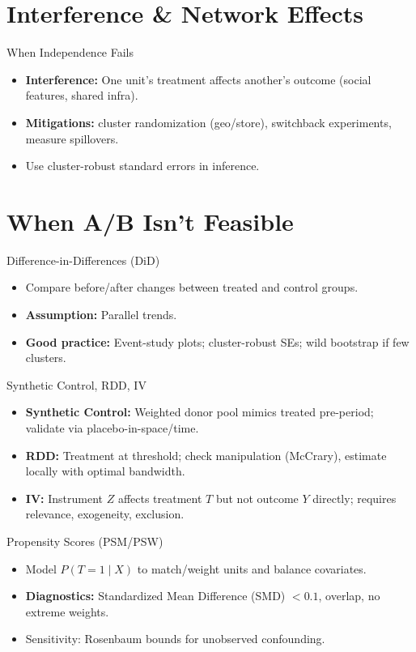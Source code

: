\documentclass[aspectratio=169]{beamer}
\begin{document}
\section{Interference \& Network Effects}
\begin{frame}{When Independence Fails}
  \begin{itemize}
    \item \textbf{Interference:} One unit's treatment affects another's outcome (social features, shared infra).
    \item \textbf{Mitigations:} cluster randomization (geo/store), switchback experiments, measure spillovers.
    \item Use cluster-robust standard errors in inference.
  \end{itemize}
\end{frame}

\section{When A/B Isn't Feasible}
\begin{frame}{Difference-in-Differences (DiD)}
  \begin{itemize}
    \item Compare before/after changes between treated and control groups.
    \item \textbf{Assumption:} Parallel trends.
    \item \textbf{Good practice:} Event-study plots; cluster-robust SEs; wild bootstrap if few clusters.
  \end{itemize}
\end{frame}

\begin{frame}{Synthetic Control, RDD, IV}
  \begin{itemize}
    \item \textbf{Synthetic Control:} Weighted donor pool mimics treated pre-period; validate via placebo-in-space/time.
    \item \textbf{RDD:} Treatment at threshold; check manipulation (McCrary), estimate locally with optimal bandwidth.
    \item \textbf{IV:} Instrument $Z$ affects treatment $T$ but not outcome $Y$ directly; requires relevance, exogeneity, exclusion.
  \end{itemize}
\end{frame}

\begin{frame}{Propensity Scores (PSM/PSW)}
  \begin{itemize}
    \item Model $P(T=1\mid X)$ to match/weight units and balance covariates.
    \item \textbf{Diagnostics:} Standardized Mean Difference (SMD) $<0.1$, overlap, no extreme weights.
    \item Sensitivity: Rosenbaum bounds for unobserved confounding.
  \end{itemize}
\end{frame}
\end{document}
